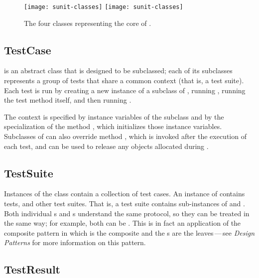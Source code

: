 \documentclass[a4paper,10pt,twoside]{book}
\begin{document}
\begin{figure}[htb]
  \begin{center}
  	\ifluluelse
		{\texttt{[image: sunit-classes]}}
		{\texttt{[image: sunit-classes]}}
	\caption{The four classes representing the core of \SUnit.}
	\label{fig:sunit-classes}
  \end{center}
\end{figure}


\subsection{TestCase}

 is an abstract class that is designed to be subclassed; each of its subclasses represents a group of tests that share a common context (that is, a test suite).
Each test is run by creating a new instance of a subclass of , running , running the test method itself, and then running .

The context is specified by instance variables of the subclass and by the specialization of the method , which initializes those instance variables.
Subclasses of  can also override method , which is invoked after the execution of each test, and can be used to release any objects allocated during .
\subsection{TestSuite}

Instances of the class  contain a collection of test cases.
An instance of  contains tests, and other test suites.
That is, a test suite contains sub-instances of
 and .
Both individual s and s understand the same protocol, so they can be treated in the same way; for example, both can be .
This is in fact an application of the composite pattern in which  is the composite and the s are the leaves\,---\,see \textit{Design Patterns} for more information on this pattern\cite{Gamm95a}.
\subsection{TestResult}
\end{document}
